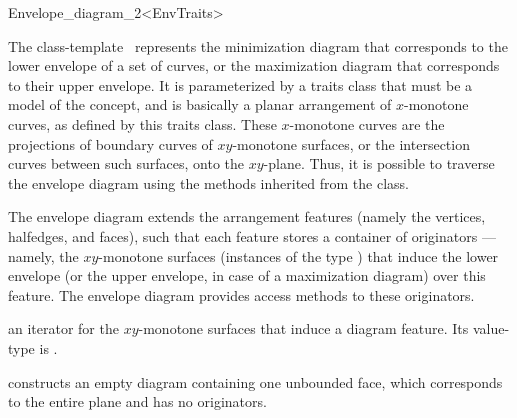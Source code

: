 
\ccRefPageBegin

\begin{ccRefClass}{Envelope_diagram_2<EnvTraits>}

\ccDefinition

The class-template \ccClassTemplateName\ represents the minimization
diagram that corresponds to the lower envelope of a set of curves, or the
maximization diagram that corresponds to their upper envelope. It is
parameterized by a traits class that must be a model of the
 concept, and is basically a planar arrangement of
$x$-monotone curves, as defined by this traits class. These $x$-monotone
curves are the projections of boundary curves of $xy$-monotone surfaces,
or the intersection curves between such surfaces, onto the $xy$-plane.
Thus, it is possible to traverse the envelope diagram using the
methods inherited from the  class.

The envelope diagram extends the arrangement features (namely the vertices,
halfedges, and faces), such that each feature stores a container of
originators --- namely, the $xy$-monotone surfaces (instances of the type
) that induce the lower envelope
(or the upper envelope, in case of a maximization diagram) over this
feature. The envelope diagram provides access methods to these originators.

 
\ccInheritsFrom

\ccTypes

\ccGlue
{}

{an iterator for the $xy$-monotone surfaces that induce a diagram feature.
 Its value-type is .}

\ccCreation
{}

    {constructs an empty diagram containing one unbounded face,
     which corresponds to the entire plane and has no originators.}
    

\end{ccRefClass}
